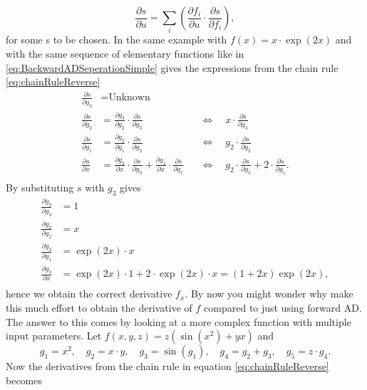 \begin{equation}
    \label{eq:chainRuleReverse}
    \frac{\partial s}{\partial u} = \sum_i\left(\frac{\partial f_i}{\partial u}\cdot\frac{\partial s}{\partial f_i}\right),
\end{equation}
for some s to be chosen. In the same example with $f(x) = x\cdot\exp(2x)$ and with the same sequence of elementary functions like in \eqref{eq:BackwardADSeperationSimple} gives the expressions from the chain rule \eqref{eq:chainRuleReverse}
\begin{align*}
    \frac{\partial s}{\partial g_3} &= \text{Unknown}\\
    \frac{\partial s}{\partial g_2} &= \frac{\partial g_3}{\partial g_2} \cdot \frac{\partial s}{\partial g_3} &&\Longleftrightarrow \quad x\cdot \frac{\partial s}{\partial g_3} \\
    \frac{\partial s}{\partial g_1} &= \frac{\partial g_2}{\partial g_1}\cdot \frac{\partial s}{\partial g_2} &&\Longleftrightarrow \quad g_2 \cdot \frac{\partial s}{\partial g_2} \\
    \frac{\partial s}{\partial x} &= \frac{\partial g_3}{\partial x}\cdot \frac{\partial s}{\partial g_3} + \frac{\partial g_1}{\partial x}\cdot \frac{\partial s}{\partial g_1} && \Longleftrightarrow \quad g_2\cdot \frac{\partial s}{\partial g_3} + 2\cdot \frac{\partial s}{\partial g_1}.\\
\end{align*}
By substituting $s$ with $g_3$ gives
\begin{align*}
    \frac{\partial g_3}{\partial g_3} &= 1\\
    \frac{\partial g_3}{\partial g_2} &= x\\
    \frac{\partial g_3}{\partial g_1} &= \exp(2x)\cdot x\\
    \frac{\partial g_3}{\partial x} &= \exp(2x)\cdot 1 + 2\cdot\exp(2x)\cdot x = (1 + 2x)\exp(2x),\\
\end{align*}
hence we obtain the correct derivative $f_x$. By now you might wonder why make this much effort to obtain the derivative of $f$ compared to just using forward AD. The answer to this comes by looking at a more complex function with multiple input parameters. Let $f(x,y,z) = z(\sin(x^2)+yx)$ and 
\begin{equation}
    g_1 = x^2, \quad g_2 = x\cdot y, \quad g_3 = \sin(g_1), \quad g_4 = g_2 + g_3, \quad g_5 = z\cdot g_4.
    \label{eq:DependencyBackwardAD}
\end{equation}
Now the derivatives from the chain rule in equation \eqref{eq:chainRuleReverse} becomes \\
